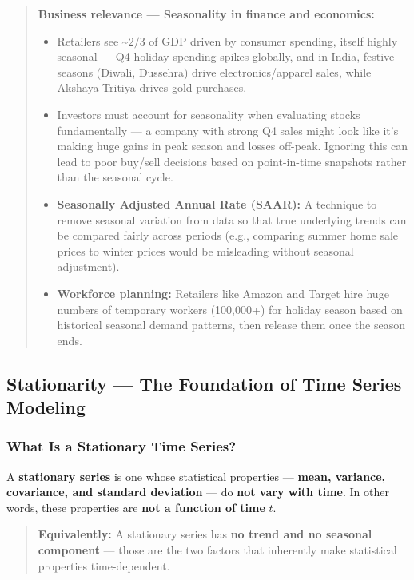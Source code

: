 \documentclass[12pt,openany]{book}
\begin{document}
\begin{quote}
\textbf{Business relevance --- Seasonality in finance and economics:}\par
\begin{itemize}[leftmargin=*]
    \item Retailers see \textasciitilde{}\(2/3\) of GDP driven by consumer spending, itself highly seasonal --- Q4 holiday spending spikes globally, and in India, festive seasons (Diwali, Dussehra) drive electronics/apparel sales, while Akshaya Tritiya drives gold purchases.
    \item Investors must account for seasonality when evaluating stocks fundamentally --- a company with strong Q4 sales might look like it's making huge gains in peak season and losses off-peak. Ignoring this can lead to poor buy/sell decisions based on point-in-time snapshots rather than the seasonal cycle.
    \item \textbf{Seasonally Adjusted Annual Rate (SAAR):} A technique to remove seasonal variation from data so that true underlying trends can be compared fairly across periods (e.g., comparing summer home sale prices to winter prices would be misleading without seasonal adjustment).
    \item \textbf{Workforce planning:} Retailers like Amazon and Target hire huge numbers of temporary workers (100,000+) for holiday season based on historical seasonal demand patterns, then release them once the season ends.
\end{itemize}

\end{quote}

\subsection{Stationarity --- The Foundation of Time Series Modeling}

\subsubsection{What Is a Stationary Time Series?}

A \textbf{stationary series} is one whose statistical properties --- \textbf{mean, variance, covariance, and standard deviation} --- do \textbf{not vary with time}. In other words, these properties are \textbf{not a function of time} \(t\).

\begin{quote}
\textbf{Equivalently:} A stationary series has \textbf{no trend and no seasonal component} --- those are the two factors that inherently make statistical properties time-dependent.\par

\end{quote}
\end{document}
